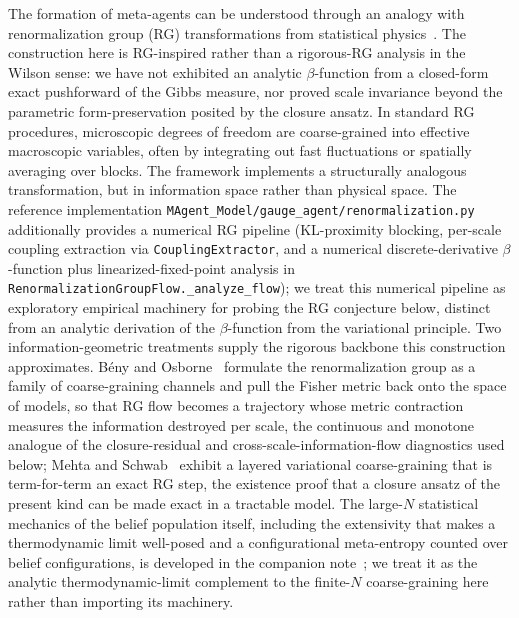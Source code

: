 \documentclass[11pt]{article}
\begin{document}
The formation of meta-agents can be understood through an analogy with renormalization group (RG) transformations from statistical physics~\cite{Wilson1971, Cardy1996}. The construction here is RG-inspired rather than a rigorous-RG analysis in the Wilson sense: we have not exhibited an analytic $\beta$-function from a closed-form exact pushforward of the Gibbs measure, nor proved scale invariance beyond the parametric form-preservation posited by the closure ansatz. In standard RG procedures, microscopic degrees of freedom are coarse-grained into effective macroscopic variables, often by integrating out fast fluctuations or spatially averaging over blocks. The framework implements a structurally analogous transformation, but in information space rather than physical space. The reference implementation \texttt{MAgent\_Model/gauge\_agent/renormalization.py} additionally provides a numerical RG pipeline (KL-proximity blocking, per-scale coupling extraction via \texttt{CouplingExtractor}, and a numerical discrete-derivative $\beta$-function plus linearized-fixed-point analysis in \texttt{RenormalizationGroupFlow.\_analyze\_flow}); we treat this numerical pipeline as exploratory empirical machinery for probing the RG conjecture below, distinct from an analytic derivation of the $\beta$-function from the variational principle. Two information-geometric treatments supply the rigorous backbone this construction approximates. B\'eny and Osborne~\cite{beny2015information} formulate the renormalization group as a family of coarse-graining channels and pull the Fisher metric back onto the space of models, so that RG flow becomes a trajectory whose metric contraction measures the information destroyed per scale, the continuous and monotone analogue of the closure-residual and cross-scale-information-flow diagnostics used below; Mehta and Schwab~\cite{mehta2014exact} exhibit a layered variational coarse-graining that is term-for-term an exact RG step, the existence proof that a closure ansatz of the present kind can be made exact in a tractable model. The large-$N$ statistical mechanics of the belief population itself, including the extensivity that makes a thermodynamic limit well-posed and a configurational meta-entropy counted over belief configurations, is developed in the companion note~\cite{Dennis2026metaentropy}; we treat it as the analytic thermodynamic-limit complement to the finite-$N$ coarse-graining here rather than importing its machinery.
\end{document}
